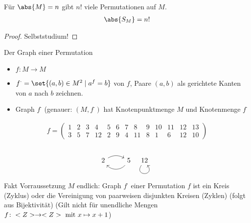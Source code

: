 \begin{proposition}
	Für $\abs{M} = n$ gibt $n!$ viele Permutationen auf $M$.
	\begin{align*}
		\abs{S_M} = n!
	\end{align*}
\end{proposition}
\begin{proof}
	Selbststudium!
\end{proof}
\begin{definition}
	Der Graph einer Permutation
	\begin{itemize}
		\item $f\colon M \to M$
		\item $f^{\cdot} = \set{(a,b) \in M^2 \mid a^f = b}$  von $f$, Paare $(a,b)$ als gerichtete Kanten von $a$ nach $b$ zeichnen.
		\item Graph $f^{\cdot}$ (genauer: $(M,f^{\cdot})$ hat Knotenpunktmenge $M$ und Knotenmenge $f^{\cdot}$
	\end{itemize}
\end{definition}
\begin{example}
	\begin{align*}
		f = \begin{pmatrix}
			1 & 2 & 3 & 4 & 5 & 6 & 7 & 8 & 9 & 10 & 11 & 12 & 13\\
			3 & 5 & 7 & 12 & 2 & 9 & 4 & 11 & 8 & 1 & 6 & 12 & 10
		\end{pmatrix}
	\end{align*}
	\\
	\[
		\begin{tikzcd}
			2 \arrow[r, bend left] & 5 \arrow[l, bend left=49]
		\end{tikzcd}
		\begin{tikzcd}
		12 \arrow[loop, distance=2em, in=305, out=235]
		\end{tikzcd}
	\]
Fakt Vorraussetzung $M$ endlich: Graph $f^{\cdot}$ einer Permutation $f$ ist ein Kreis (Zyklus) oder die Vereinigung  von paarweisen disjunkten Kreisen (Zyklen) (folgt aus Bijektivität) (Gilt nicht für unendliche Mengen $f \colon <Z> \to <Z> \text{ mit } x \mapsto x+1$)
\end{example}
